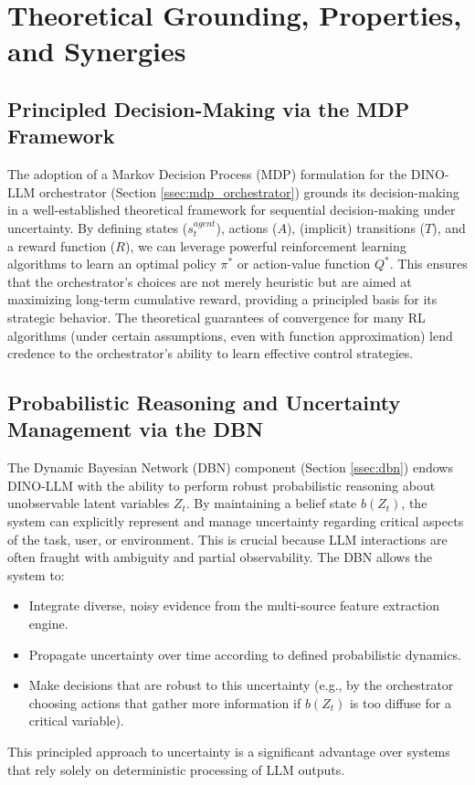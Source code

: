 \documentclass[11pt]{article}
\begin{document}
\section{Theoretical Grounding, Properties, and Synergies}
\label{sec:theoretical_grounding}

\subsection{Principled Decision-Making via the MDP Framework}
\label{ssec:tg_mdp}
The adoption of a Markov Decision Process (MDP) formulation for the DINO-LLM orchestrator (Section \ref{ssec:mdp_orchestrator}) grounds its decision-making in a well-established theoretical framework for sequential decision-making under uncertainty. By defining states ($s_t^{agent}$), actions ($A$), (implicit) transitions ($T$), and a reward function ($R$), we can leverage powerful reinforcement learning algorithms to learn an optimal policy $\pi^*$ or action-value function $Q^*$. This ensures that the orchestrator's choices are not merely heuristic but are aimed at maximizing long-term cumulative reward, providing a principled basis for its strategic behavior. The theoretical guarantees of convergence for many RL algorithms (under certain assumptions, even with function approximation) lend credence to the orchestrator's ability to learn effective control strategies.

\subsection{Probabilistic Reasoning and Uncertainty Management via the DBN}
\label{ssec:tg_dbn}
The Dynamic Bayesian Network (DBN) component (Section \ref{ssec:dbn}) endows DINO-LLM with the ability to perform robust probabilistic reasoning about unobservable latent variables $Z_t$. By maintaining a belief state $b(Z_t)$, the system can explicitly represent and manage uncertainty regarding critical aspects of the task, user, or environment. This is crucial because LLM interactions are often fraught with ambiguity and partial observability. The DBN allows the system to:
\begin{itemize}
    \item Integrate diverse, noisy evidence from the multi-source feature extraction engine.
    \item Propagate uncertainty over time according to defined probabilistic dynamics.
    \item Make decisions that are robust to this uncertainty (e.g., by the orchestrator choosing actions that gather more information if $b(Z_t)$ is too diffuse for a critical variable).
\end{itemize}
This principled approach to uncertainty is a significant advantage over systems that rely solely on deterministic processing of LLM outputs.
\end{document}
